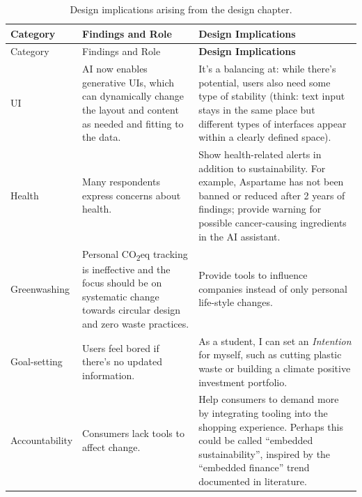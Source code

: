 \documentclass[
  12pt,
  letterpaper,
  DIV=11,
  numbers=noendperiod]{scrartcl}
\begin{document}
\begin{longtable}[]{@{}
  >{\raggedright\arraybackslash}p{}
  >{\raggedright\arraybackslash}p{}
  >{\raggedright\arraybackslash}p{}@{}}
\caption{Design implications arising from the design
chapter.}\tabularnewline
\toprule\noalign{}
\begin{minipage}[b]{\linewidth}\raggedright
Category
\end{minipage} & \begin{minipage}[b]{\linewidth}\raggedright
Findings and Role
\end{minipage} & \begin{minipage}[b]{\linewidth}\raggedright
\textbf{Design Implications}
\end{minipage} \\
\midrule\noalign{}
\endfirsthead
\toprule\noalign{}
\begin{minipage}[b]{\linewidth}\raggedright
Category
\end{minipage} & \begin{minipage}[b]{\linewidth}\raggedright
Findings and Role
\end{minipage} & \begin{minipage}[b]{\linewidth}\raggedright
\textbf{Design Implications}
\end{minipage} \\
\midrule\noalign{}
\endhead
\bottomrule\noalign{}
\endlastfoot
UI & AI now enables generative UIs, which can dynamically change the
layout and content as needed and fitting to the data. & It's a balancing
at: while there's potential, users also need some type of stability
(think: text input stays in the same place but different types of
interfaces appear within a clearly defined space). \\
Health & Many respondents express concerns about health. & Show
health-related alerts in addition to sustainability. For example,
Aspartame has not been banned or reduced after 2 years of findings;
provide warning for possible cancer-causing ingredients in the AI
assistant. \\
Greenwashing & Personal CO\textsubscript{2}eq tracking is ineffective
and the focus should be on systematic change towards circular design and
zero waste practices. & Provide tools to influence companies instead of
only personal life-style changes. \\
Goal-setting & Users feel bored if there's no updated information. & As
a student, I can set an \emph{Intention} for myself, such as cutting
plastic waste or building a climate positive investment portfolio. \\
Accountability & Consumers lack tools to affect change. & Help consumers
to demand more by integrating tooling into the shopping experience.
Perhaps this could be called ``embedded sustainability'', inspired by
the ``embedded finance'' trend documented in literature. \\
\end{longtable}
\end{document}
